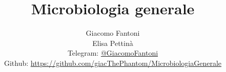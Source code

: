 

\title{\Huge \textbf{Microbiologia generale}}

\author{
  Giacomo Fantoni \\
  Elisa Pettin\`a \\
  \small Telegram: \href{https://t.me/GiacomoFantoni}{@GiacomoFantoni} \\[3pt]
  \small Github: \href{https://github.com/giacThePhantom/MicrobiologiaGenerale}{https://github.com/giacThePhantom/MicrobiologiaGenerale}}

\maketitle
\tableofcontents




